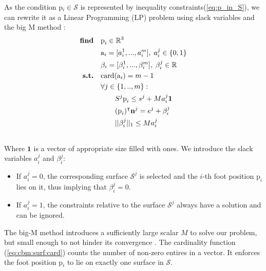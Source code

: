 As the condition p$_i \in \mathcal{S}$ is represented by inequality constraints(\ref{eq:p_in_S}), we can rewrite it as a Linear Programming (LP) problem using slack variables and the big M method \cite{big_M}:
\begin{align}
    \textrm{\textbf{find}}  \quad & \mbox{p}_i \in \mathbb{R}^3 \nonumber\\
                            \quad & \mbox{a}_i=[a_i^1,...,a_i^m], \; a_i^j \in \{0,1\} \nonumber\\
                            \quad & \beta_i=[\beta_i^1,...,\beta_i^m], \; \beta_i^j \in \mathbb{R} \nonumber\\
    \textrm{\textbf{s.t.}}  \quad & \mbox{card}(\mbox{a}_i) = m-1 \label{eq:cbm:surf:card}\\
                            \quad & \forall j \in \{1,..,m\} : \nonumber\\
                            \quad & \quad \quad S^j\mbox{p}_i \leq s^j + M a_i^j \textbf{1} \nonumber\\
                            \quad & \quad \quad (\mbox{p}_i)^{\intercal} \textbf{n}^j = e^j + \beta_i^j \nonumber\\
                            \quad & \quad \quad ||\beta_i^j||_1 \leq M a_i^j \nonumber\\
                            \nonumber
\end{align}
Where $\textbf{1}$ is a vector of appropriate size filled with ones.
We introduce the slack variables $a_i^j$ and $\beta_i^j$:
\begin{itemize}
	\item If $a_i^j = 0$, the corresponding surface $\mathcal{S}^j$ is selected and the $i$-th foot position $\mbox{p}_i$ lies on it, thus implying that $\beta_i^j = 0$.
	\item If $a_i^j = 1$, the constraints relative to the surface $\mathcal{S}^j$ always have a solution and can be ignored.
\end{itemize}
The big-M method introduces a sufficiently large scalar $M$ to solve our problem, but small enough to not hinder its convergence \cite{big_M_danger}.
The cardinality function (\ref{eq:cbm:surf:card}) counts the number of non-zero entires in a vector. 
It enforces the foot position p$_i$ to lie on exactly one surface in $\mathcal{S}$.

